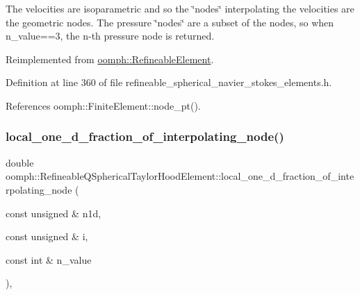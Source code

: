 The velocities are isoparametric and so the \char`\"{}nodes\char`\"{} interpolating the velocities are the geometric nodes. The pressure \char`\"{}nodes\char`\"{} are a subset of the nodes, so when n\+\_\+value==3, the n-\/th pressure node is returned. 



Reimplemented from \hyperlink{classoomph_1_1RefineableElement_ab27986fc2f6033a4758662cde78a7b76}{oomph\+::\+Refineable\+Element}.



Definition at line 360 of file refineable\+\_\+spherical\+\_\+navier\+\_\+stokes\+\_\+elements.\+h.



References oomph\+::\+Finite\+Element\+::node\+\_\+pt().

\mbox{\label{classoomph_1_1RefineableQSphericalTaylorHoodElement_aadbbd7d1a8aa8170490d81b6f9602ed0}} 
\subsubsection{\texorpdfstring{local\+\_\+one\+\_\+d\+\_\+fraction\+\_\+of\+\_\+interpolating\+\_\+node()}{local\_one\_d\_fraction\_of\_interpolating\_node()}}
{\footnotesize\ttfamily double oomph\+::\+Refineable\+Q\+Spherical\+Taylor\+Hood\+Element\+::local\+\_\+one\+\_\+d\+\_\+fraction\+\_\+of\+\_\+interpolating\+\_\+node (\begin{DoxyParamCaption}\item[{const unsigned \&}]{n1d,  }\item[{const unsigned \&}]{i,  }\item[{const int \&}]{n\+\_\+value }\end{DoxyParamCaption})\hspace{0.3cm}{\ttfamily [inline]}, {\ttfamily [virtual]}}



